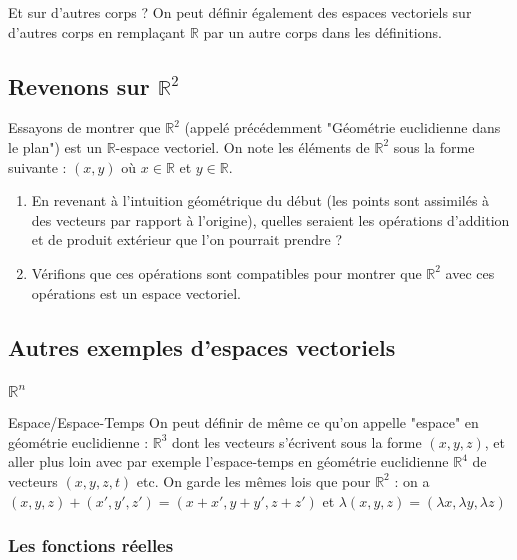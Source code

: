 \documentclass{classe}
\begin{document}
\begin{remarque}{Et sur d'autres corps ?}{}
On peut définir également des espaces vectoriels sur d'autres corps en remplaçant $\mathbb{R}$ par un autre corps dans les définitions.
\end{remarque}

\subsection{Revenons sur $\mathbb{R}^2$}

Essayons de montrer que $\mathbb{R}^2$ (appelé précédemment "Géométrie euclidienne dans le plan") est un $\mathbb{R}$-espace vectoriel. On note les éléments de $\mathbb{R}^2$ sous la forme suivante : $(x, y)$ où $x\in\mathbb{R}$ et $y\in\mathbb{R}$.

\begin{enumerate}
	\item En revenant à l'intuition géométrique du début (les points sont assimilés à des vecteurs par rapport à l'origine), quelles seraient les opérations d'addition et de produit extérieur que l'on pourrait prendre ?
	\item Vérifions que ces opérations sont compatibles pour montrer que $\mathbb{R}^2$ avec ces opérations est un espace vectoriel.
\end{enumerate}

\subsection{Autres exemples d'espaces vectoriels}

\subsubsection{$\mathbb{R}^n$}

\begin{définition}{Espace/Espace-Temps}{}
On peut définir de même ce qu'on appelle "espace" en géométrie euclidienne : $\mathbb{R}^3$ dont les vecteurs s'écrivent sous la forme $(x, y, z)$, et aller plus loin avec par exemple l'espace-temps en géométrie euclidienne $\mathbb{R}^4$ de vecteurs $(x, y, z, t)$ etc. On garde les mêmes lois que pour $\mathbb{R}^2$ : on a $(x, y, z) + (x', y', z') = (x+x', y+y', z+z')$ et $\lambda(x, y, z) = (\lambda x, \lambda y, \lambda z)$
\end{définition}

\subsubsection{Les fonctions réelles}
\end{document}
